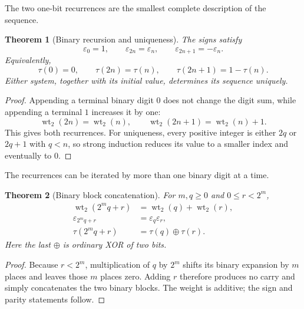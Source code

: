 \documentclass[11pt,oneside]{article}
\newtheorem{theorem}{Theorem}[section]
\theoremstyle{definition}
\theoremstyle{remark}
\newcommand{\wt}{\operatorname{wt}_2}
\newcommand{\xor}{\mathbin{\oplus}}
\begin{document}
The two one-bit recurrences are the smallest complete description of the
sequence.

\begin{theorem}[Binary recursion and uniqueness]
\label{thm:binary-recursion}
The signs satisfy
\begin{equation}
  \varepsilon_0=1,
  \qquad
  \varepsilon_{2n}=\varepsilon_n,
  \qquad
  \varepsilon_{2n+1}=-\varepsilon_n.                       \label{eq:sign-recursion}
\end{equation}
Equivalently,
\begin{equation}
  \tau(0)=0,
  \qquad
  \tau(2n)=\tau(n),
  \qquad
  \tau(2n+1)=1-\tau(n).                                    \label{eq:bit-recursion}
\end{equation}
Either system, together with its initial value, determines its sequence uniquely.
\end{theorem}

\begin{proof}
Appending a terminal binary digit $0$ does not change the digit sum, while
appending a terminal $1$ increases it by one:
\[
  \wt(2n)=\wt(n),\qquad \wt(2n+1)=\wt(n)+1.
\]
This gives both recurrences.  For uniqueness, every positive integer is either
$2q$ or $2q+1$ with $q<n$, so strong induction reduces its value to a smaller
index and eventually to $0$.
\end{proof}

The recurrences can be iterated by more than one binary digit at a time.

\begin{theorem}[Binary block concatenation]
\label{thm:block-concatenation}
For $m,q\ge0$ and $0\le r<2^m$,
\begin{align}
  \wt(2^m q+r)&=\wt(q)+\wt(r),                              \label{eq:weight-block}\\
  \varepsilon_{2^m q+r}&=\varepsilon_q\varepsilon_r,       \label{eq:sign-block}\\
  \tau(2^m q+r)&=\tau(q)\xor\tau(r).                       \label{eq:tau-block}
\end{align}
Here the last $\xor$ is ordinary XOR of two bits.
\end{theorem}

\begin{proof}
Because $r<2^m$, multiplication of $q$ by $2^m$ shifts its binary expansion by
$m$ places and leaves those $m$ places zero.  Adding $r$ therefore produces no
carry and simply concatenates the two binary blocks.  The weight is additive;
the sign and parity statements follow.
\end{proof}
\end{document}
